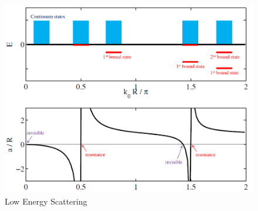 \documentclass{school-22.101-notes}
\begin{document}
\begin{figure}[ht]
\centering
\includegraphics[width=5in]{images/scattering/low-energy.png}
\caption{Low Energy Scattering} \label{low-energy}
\end{figure}
\end{document}
